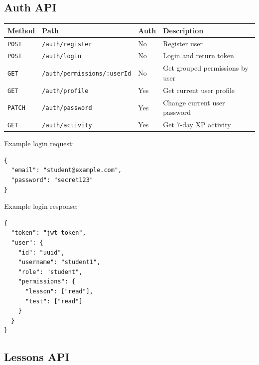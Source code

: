 \documentclass[11pt,a4paper]{article}
\newcommand{\docpath}[1]{\texttt{#1}}
\begin{document}
\subsection{Auth API}

\begin{longtable}{L{0.12\textwidth}L{0.31\textwidth}L{0.12\textwidth}L{0.35\textwidth}}
\toprule
\textbf{Method} & \textbf{Path} & \textbf{Auth} & \textbf{Description} \\
\midrule
\endhead
\docpath{POST} & \docpath{/auth/register} & No & Register user \\
\docpath{POST} & \docpath{/auth/login} & No & Login and return token \\
\docpath{GET} & \docpath{/auth/permissions/:userId} & No & Get grouped permissions by user \\
\docpath{GET} & \docpath{/auth/profile} & Yes & Get current user profile \\
\docpath{PATCH} & \docpath{/auth/password} & Yes & Change current user password \\
\docpath{GET} & \docpath{/auth/activity} & Yes & Get 7-day XP activity \\
\bottomrule
\end{longtable}

Example login request:
\begin{lstlisting}[style=doccode]
{
  "email": "student@example.com",
  "password": "secret123"
}
\end{lstlisting}

Example login response:
\begin{lstlisting}[style=doccode]
{
  "token": "jwt-token",
  "user": {
    "id": "uuid",
    "username": "student1",
    "role": "student",
    "permissions": {
      "lesson": ["read"],
      "test": ["read"]
    }
  }
}
\end{lstlisting}

\subsection{Lessons API}
\end{document}
